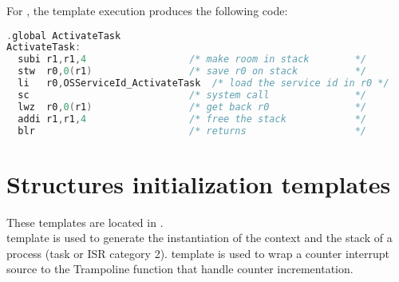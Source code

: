 For , the template execution produces the following code:

\begin{lstlisting}[language=C]
  .global ActivateTask
ActivateTask:
  subi r1,r1,4                  /* make room in stack        */
  stw  r0,0(r1)                 /* save r0 on stack          */
  li   r0,OSServiceId_ActivateTask  /* load the service id in r0 */
  sc                            /* system call               */
  lwz  r0,0(r1)                 /* get back r0               */
  addi r1,r1,4                  /* free the stack            */
  blr                           /* returns                   */
\end{lstlisting}

\section{Structures initialization templates}

These templates are located in .\\ template  is used to generate the instantiation of the context and the stack of a process (task or ISR category 2). template  is used to wrap a counter interrupt source to the Trampoline function that handle counter incrementation.